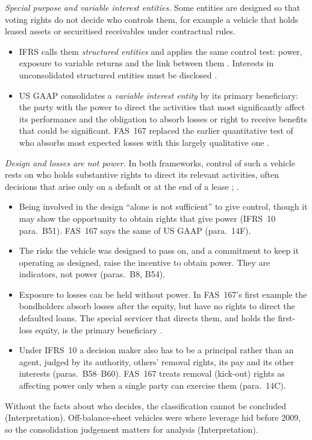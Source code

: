 \begin{qfdefinition}
\emph{Special purpose and variable interest entities.} Some entities are designed so that voting rights do not decide who controls them, for example a vehicle that holds leased assets or securitised receivables under contractual rules.
\begin{itemize}
\item IFRS calls them \emph{structured entities} \citep[App.~A, para.~B21]{eu-2023-1803-ifrs12} and applies the same control test: power, exposure to variable returns and the link between them \citep[para.~7]{eu-2023-1803-ifrs10}. Interests in unconsolidated structured entities must be disclosed \citep[paras.~24--31]{eu-2023-1803-ifrs12}.
\item US GAAP consolidates a \emph{variable interest entity} by its primary beneficiary: the party with the power to direct the activities that most significantly affect its performance and the obligation to absorb losses or right to receive benefits that could be significant. FAS~167 replaced the earlier quantitative test of who absorbs most expected losses with this largely qualitative one \citep[Summary; para.~14A]{us-variable-interest-entities-2009}.
\end{itemize}

\emph{Design and losses are not power.} In both frameworks, control of such a vehicle rests on who holds substantive rights to direct its relevant activities, often decisions that arise only on a default or at the end of a lease \citep[paras.~10, B9, B22, B53]{eu-2023-1803-ifrs10}; \citep[para.~14B]{us-variable-interest-entities-2009}.
\begin{itemize}
\item Being involved in the design ``alone is not sufficient'' to give control, though it may show the opportunity to obtain rights that give power (IFRS~10 para.~B51). FAS~167 says the same of US GAAP (para.~14F).
\item The risks the vehicle was designed to pass on, and a commitment to keep it operating as designed, raise the incentive to obtain power. They are indicators, not power (paras.~B8, B54).
\item Exposure to losses can be held without power. In FAS~167's first example the bondholders absorb losses after the equity, but have no rights to direct the defaulted loans. The special servicer that directs them, and holds the first-loss equity, is the primary beneficiary \citep[paras.~C2--C12]{us-variable-interest-entities-2009}.
\item Under IFRS~10 a decision maker also has to be a principal rather than an agent, judged by its authority, others' removal rights, its pay and its other interests (paras.~B58--B60). FAS~167 treats removal (kick-out) rights as affecting power only when a single party can exercise them (para.~14C).
\end{itemize}
Without the facts about who decides, the classification cannot be concluded (Interpretation).
Off-balance-sheet vehicles were where leverage hid before 2009, so the consolidation judgement matters for analysis (Interpretation).


\end{qfdefinition}

